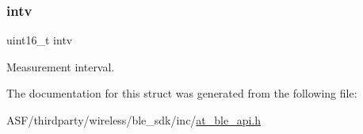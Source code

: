 \subsubsection{\texorpdfstring{intv}{intv}}
{\footnotesize\ttfamily uint16\+\_\+t intv}



Measurement interval. 



The documentation for this struct was generated from the following file\+:\begin{DoxyCompactItemize}
\item 
A\+S\+F/thirdparty/wireless/ble\+\_\+sdk/inc/\mbox{\hyperlink{at__ble__api_8h}{at\+\_\+ble\+\_\+api.\+h}}\end{DoxyCompactItemize}
